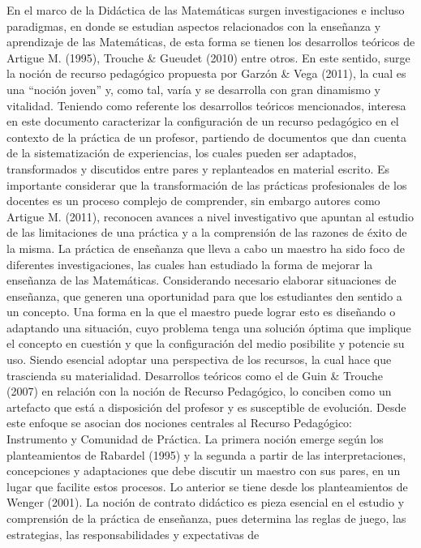 En el marco de la Didáctica de las Matemáticas surgen investigaciones
e incluso paradigmas, en donde se estudian aspectos relacionados con
la enseñanza y aprendizaje de las Matemáticas, de esta forma se tienen
los desarrollos teóricos de Artigue M. (1995), Trouche \& Gueudet
(2010) entre otros. En este sentido, surge la noción de recurso pedagógico
propuesta por Garzón \& Vega (2011), la cual es una “noción joven”
y, como tal, varía y se desarrolla con gran dinamismo y vitalidad.
Teniendo como referente los desarrollos teóricos mencionados, interesa
en este documento caracterizar la configuración de un recurso pedagógico
en el contexto de la práctica de un profesor, partiendo de documentos
que dan cuenta de la sistematización de experiencias, los cuales pueden
ser adaptados, transformados y discutidos entre pares y replanteados
en material escrito. Es importante considerar que la transformación
de las prácticas profesionales de los docentes es un proceso complejo
de comprender, sin embargo autores como Artigue M. (2011), reconocen
avances a nivel investigativo que apuntan al estudio de las limitaciones
de una práctica y a la comprensión de las razones de éxito de la misma.
La práctica de enseñanza que lleva a cabo un maestro ha sido foco
de diferentes investigaciones, las cuales han estudiado la forma de
mejorar la enseñanza de las Matemáticas. Considerando necesario elaborar
situaciones de enseñanza, que generen una oportunidad para que los
estudiantes den sentido a un concepto. Una forma en la que el maestro
puede lograr esto es diseñando o adaptando una situación, cuyo problema
tenga una solución óptima que implique el concepto en cuestión y que
la configuración del medio posibilite y potencie su uso. Siendo esencial
adoptar una perspectiva de los recursos, la cual hace que trascienda
su materialidad. Desarrollos teóricos como el de Guin \& Trouche (2007)
en relación con la noción de Recurso Pedagógico, lo conciben como
un artefacto que está a disposición del profesor y es susceptible
de evolución. Desde este enfoque se asocian dos nociones centrales
al Recurso Pedagógico: Instrumento y Comunidad de Práctica. La primera
noción emerge según los planteamientos de Rabardel (1995) y la segunda
a partir de las interpretaciones, concepciones y adaptaciones que
debe discutir un maestro con sus pares, en un lugar que facilite estos
procesos. Lo anterior se tiene desde los planteamientos de Wenger
(2001). La noción de contrato didáctico es pieza esencial en el estudio
y comprensión de la práctica de enseñanza, pues determina las reglas
de juego, las estrategias, las responsabilidades y expectativas de

